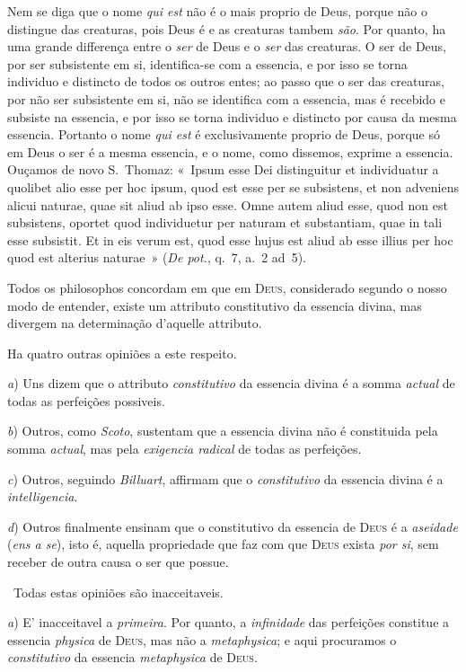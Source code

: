 {Nem se diga que o nome \emph{qui est} não é o mais proprio de Deus, porque não o distingue
das creaturas, pois Deus é e as creaturas tambem \emph{são}. Por quanto, ha uma grande
differença entre o \emph{ser} de Deus e o \emph{ser} das creaturas. O ser de Deus, por ser
subsistente em si, identifica-se com a essencia, e por isso se torna individuo e distincto
de todos os outros entes; ao passo que o ser das creaturas, por não ser subsistente em si,
não se identifica com a essencia, mas é recebido e subsiste na essencia, e por isso se
torna individuo e distincto por causa da mesma essencia. Portanto o nome \emph{qui est} é
exclusivamente proprio de Deus, porque só em Deus o ser é a mesma essencia, e o nome, como
dissemos, exprime a essencia. Ouçamos de novo S.~Thomaz: «~Ipsum esse Dei distinguitur et
individuatur a quolibet alio esse per hoc ipsum, quod est esse per se subsistens, et non
adveniens alicui naturae, quae sit aliud ab ipso esse. Omne autem aliud esse, quod non est
subsistens, oportet quod individuetur per naturam et substantiam, quae in tali esse
subsistit. Et in eis verum est, quod esse hujus est aliud ab esse illius per hoc quod est
alterius naturae~» (\emph{De pot.}, q.~7, a.~2 ad~5).

\asterisco Todos os philosophos concordam em que em \textsc{Deus}, considerado segundo o
nosso modo de entender, existe um attributo constitutivo da essencia divina, mas divergem
na determinação d'aquelle attributo.

Ha quatro outras opiniões a este respeito.

\emph{a}) Uns dizem que o attributo \emph{constitutivo} da essencia divina é a somma
\emph{actual} de todas as perfeições possiveis.

\emph{b}) Outros, como \emph{Scoto}, sustentam que a essencia divina não é constituida
pela somma \emph{actual}, mas pela \emph{exigencia radical} de todas as perfeições.

\emph{c}) Outros, seguindo \emph{Billuart}, affirmam que o \emph{constitutivo} da essencia
divina é a \emph{intelligencia}.

\emph{d}) Outros finalmente ensinam que o constitutivo da essencia de \textsc{Deus} é a
\emph{aseidade} (\emph{ens a se}), isto é, aquella propriedade que faz com que
\textsc{Deus} exista \emph{por si}, sem receber de outra causa o ser que possue.

~Todas estas opiniões são inacceitaveis.

\emph{a}) E' inacceitavel a \emph{primeira}. Por quanto, a \emph{infinidade} das
perfeições constitue a essencia \emph{physica} de \textsc{Deus}, mas não a
\emph{metaphysica}; e aqui procuramos o \emph{constitutivo} da essencia \emph{metaphysica}
de \textsc{Deus}.

}
